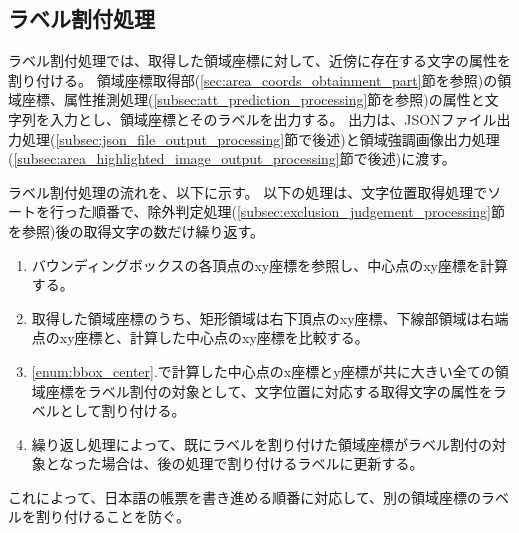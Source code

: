 \subsection{ラベル割付処理}\label{subsec:label_link_processing}
ラベル割付処理では、取得した領域座標に対して、近傍に存在する文字の属性を割り付ける。
領域座標取得部(\ref{sec:area_coords_obtainment_part}節を参照)の領域座標、属性推測処理(\ref{subsec:att_prediction_processing}節を参照)の属性と文字列を入力とし、領域座標とそのラベルを出力する。
出力は、JSONファイル出力処理(\ref{subsec:json_file_output_processing}節で後述)と領域強調画像出力処理(\ref{subsec:area_highlighted_image_output_processing}節で後述)に渡す。

ラベル割付処理の流れを、以下に示す。
以下の処理は、文字位置取得処理でソートを行った順番で、除外判定処理(\ref{subsec:exclusion_judgement_processing}節を参照)後の取得文字の数だけ繰り返す。
\begin{enumerate}
    \item \label{enum:bbox_center} バウンディングボックスの各頂点のxy座標を参照し、中心点のxy座標を計算する。
    \item 取得した領域座標のうち、矩形領域は右下頂点のxy座標、下線部領域は右端点のxy座標と、計算した中心点のxy座標を比較する。
    \item \ref{enum:bbox_center}.で計算した中心点のx座標とy座標が共に大きい全ての領域座標をラベル割付の対象として、文字位置に対応する取得文字の属性をラベルとして割り付ける。
    \item 繰り返し処理によって、既にラベルを割り付けた領域座標がラベル割付の対象となった場合は、後の処理で割り付けるラベルに更新する。
\end{enumerate}
これによって、日本語の帳票を書き進める順番に対応して、別の領域座標のラベルを割り付けることを防ぐ。


